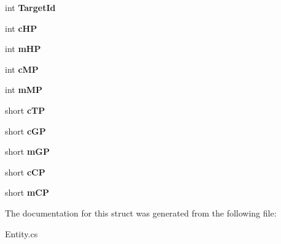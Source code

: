 \begin{DoxyCompactItemize}
\item 
\hypertarget{structffxivlib_1_1_entity_1_1_e_n_t_i_t_y_i_n_f_o_a5037220e6d432e2fb27d089a0e33336d}{int {\bfseries Target\-Id}}\label{structffxivlib_1_1_entity_1_1_e_n_t_i_t_y_i_n_f_o_a5037220e6d432e2fb27d089a0e33336d}

\item 
\hypertarget{structffxivlib_1_1_entity_1_1_e_n_t_i_t_y_i_n_f_o_a4eb1c6c096373de42566abdbf6bc5921}{int {\bfseries c\-H\-P}}\label{structffxivlib_1_1_entity_1_1_e_n_t_i_t_y_i_n_f_o_a4eb1c6c096373de42566abdbf6bc5921}

\item 
\hypertarget{structffxivlib_1_1_entity_1_1_e_n_t_i_t_y_i_n_f_o_af2cbe0f7b155434b9995482b59a45992}{int {\bfseries m\-H\-P}}\label{structffxivlib_1_1_entity_1_1_e_n_t_i_t_y_i_n_f_o_af2cbe0f7b155434b9995482b59a45992}

\item 
\hypertarget{structffxivlib_1_1_entity_1_1_e_n_t_i_t_y_i_n_f_o_a81af69b94f15abeba9263682bd805ab5}{int {\bfseries c\-M\-P}}\label{structffxivlib_1_1_entity_1_1_e_n_t_i_t_y_i_n_f_o_a81af69b94f15abeba9263682bd805ab5}

\item 
\hypertarget{structffxivlib_1_1_entity_1_1_e_n_t_i_t_y_i_n_f_o_a3aad5eb2ed4ecff5e902cd054daf2d9b}{int {\bfseries m\-M\-P}}\label{structffxivlib_1_1_entity_1_1_e_n_t_i_t_y_i_n_f_o_a3aad5eb2ed4ecff5e902cd054daf2d9b}

\item 
\hypertarget{structffxivlib_1_1_entity_1_1_e_n_t_i_t_y_i_n_f_o_a680dced63aeb961d2d7ff24372f0b3df}{short {\bfseries c\-T\-P}}\label{structffxivlib_1_1_entity_1_1_e_n_t_i_t_y_i_n_f_o_a680dced63aeb961d2d7ff24372f0b3df}

\item 
\hypertarget{structffxivlib_1_1_entity_1_1_e_n_t_i_t_y_i_n_f_o_a905fc67478130ba6433fe2b9b4d0ddec}{short {\bfseries c\-G\-P}}\label{structffxivlib_1_1_entity_1_1_e_n_t_i_t_y_i_n_f_o_a905fc67478130ba6433fe2b9b4d0ddec}

\item 
\hypertarget{structffxivlib_1_1_entity_1_1_e_n_t_i_t_y_i_n_f_o_a27e352e8bc836e304bf2e894bb5e8763}{short {\bfseries m\-G\-P}}\label{structffxivlib_1_1_entity_1_1_e_n_t_i_t_y_i_n_f_o_a27e352e8bc836e304bf2e894bb5e8763}

\item 
\hypertarget{structffxivlib_1_1_entity_1_1_e_n_t_i_t_y_i_n_f_o_a5dbc987ec84d02225a56549219a72670}{short {\bfseries c\-C\-P}}\label{structffxivlib_1_1_entity_1_1_e_n_t_i_t_y_i_n_f_o_a5dbc987ec84d02225a56549219a72670}

\item 
\hypertarget{structffxivlib_1_1_entity_1_1_e_n_t_i_t_y_i_n_f_o_a4672bd0fd646d4eea56955cb07f41998}{short {\bfseries m\-C\-P}}\label{structffxivlib_1_1_entity_1_1_e_n_t_i_t_y_i_n_f_o_a4672bd0fd646d4eea56955cb07f41998}

\end{DoxyCompactItemize}


The documentation for this struct was generated from the following file\-:\begin{DoxyCompactItemize}
\item 
Entity.\-cs\end{DoxyCompactItemize}
